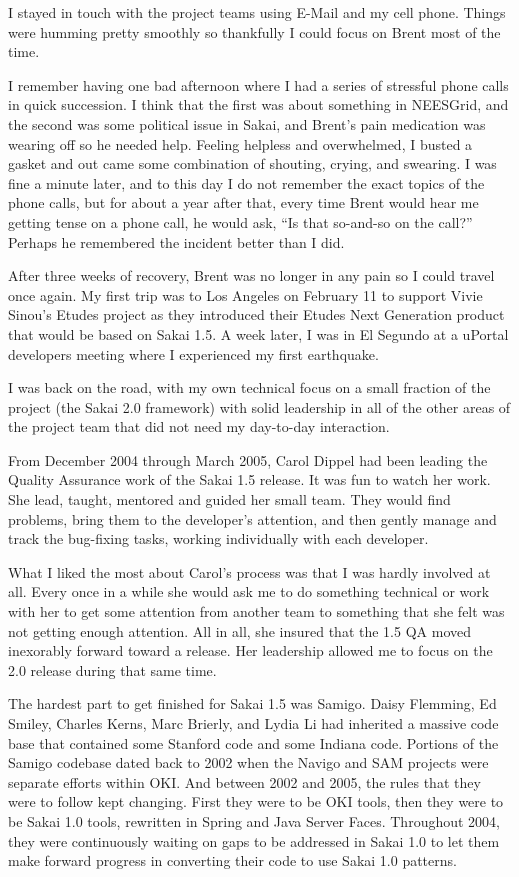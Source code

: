 \documentclass[12pt]{book}
\begin{document}
I stayed in touch with the project teams using E-Mail and
my cell phone.  Things were humming pretty smoothly
so thankfully I could focus on Brent most of the time.

I remember having one bad afternoon where I had a series
of stressful phone calls in quick succession.
I think that the first was about something in NEESGrid,
and the second was some political issue in Sakai,
and Brent's pain medication was wearing off so he needed
help.  Feeling helpless and overwhelmed, I busted a gasket
and out came some combination of shouting, crying,
and swearing.  I was fine a minute later,
and to this day I do not remember the exact topics
of the phone calls, but for about a year after
that, every time Brent would hear me getting tense on
a phone call, he would ask, ``Is that so-and-so
on the call?''  Perhaps he remembered the incident
better than I did.

After three weeks of recovery, Brent was no longer in any pain
so I could travel once again.  My first trip was to Los Angeles
on February 11 to support Vivie Sinou's Etudes project as
they introduced their Etudes Next Generation product
that would be based on Sakai 1.5.   A week later, I
was in El Segundo at a uPortal developers meeting
where I experienced my first earthquake.

I was back on the road, with my own technical focus
on a small fraction of the project (the Sakai 2.0
framework) with solid leadership in all of the other
areas of the project team that did not need
my day-to-day interaction.

From December 2004 through March 2005, Carol Dippel had been
leading the Quality Assurance work of the Sakai 1.5 release.
It was fun to watch her work.  She lead, taught, mentored and
guided her small team. They would find problems, bring
them to the developer's attention, and then gently manage
and track the bug-fixing tasks, working individually
with each developer.

What I liked the most about Carol's process was that I was
hardly involved at all.  Every once in a while she would
ask me to do something technical or work with her
to get some attention from another team to something
that she felt was not getting enough attention.  All
in all, she insured that the 1.5 QA moved inexorably
forward toward a release.  Her leadership allowed me
to focus on the 2.0 release during that same time.

The hardest part to get finished for Sakai 1.5
was Samigo.   Daisy Flemming, Ed Smiley, Charles Kerns, Marc Brierly,
and Lydia Li had inherited
a massive code base that contained some Stanford code and
some Indiana code.  Portions of the Samigo codebase dated back to
2002 when the Navigo and SAM projects were separate
efforts within OKI.  And between 2002 and 2005, the rules
that they were to follow kept changing.  First they were
to be OKI tools, then they were to be Sakai 1.0 tools,
rewritten in Spring and Java Server Faces.  Throughout
2004, they were continuously waiting on gaps to be
addressed in Sakai 1.0 to let them make forward progress in
converting their code to use Sakai 1.0 patterns.
\end{document}
